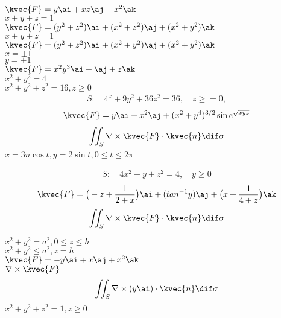 \(\kvec{F}= y \ai + xz \aj + x^2 \ak \) \\
\(x+y+z=1\)\\

\(\kvec{F}= (y^2 +z^2)\ai + (x^2+z^2)\aj + (x^2+y^2)\ak \) \\
\(x+y+z=1\) \\

\(\kvec{F}=(y^2+z^2)\ai + (x^2+y^2)\aj + (x^2+y^2)\ak \) \\
\(x=\pm1 \) \\
\(y=\pm1 \) \\

\(\kvec{F}=x^2y^3\ai + \aj +z\ak \) \\
\(x^2+y^2=4 \) \\
\(x^2 +y^2 +z^2 =16 , z\ge 0 \) \\

\begin{align*}
S: \quad 4^x+9y^2+36z^2 =36, \quad z\ge=0,
\end{align*}
\begin{align*}
\kvec{F}= y\ai +x^2\aj + (x^2 +y^4 )^{3/2} \sin e^{\sqrt{xyz}}
\end{align*}
\begin{align*}
\iint_S \nabla \times \kvec{F} \cdot \kvec{n} \dif \sigma
\end{align*}
\( x=3n\cos t, y=2 \sin t, 0\le t\le 2\pi \) 

\begin{align*}
S: \quad 4x^2 +y+z^2=4, \quad y\ge0
\end{align*}
\begin{align*}
\kvec{F} = \big( -z + \frac{1}{2+x} \big)\ai + (tan^{-1} y) \aj + \big( x + \frac{1}{4+z} \big) \ak
\end{align*}
\begin{align*}
\iint_S \nabla \times \kvec{F} \cdot \kvec{n} \dif \sigma
\end{align*}

\(x^2 + y^2 = a^2 , 0 \le z \le h \) \\
\(x^2+y^2 \le a^2, z=h  \) \\
\(\kvec{F} = - y \ai + x\aj + x^2 \ak \) \\
\( \nabla \times \kvec{F} \) \\

\begin{align*}
\iint_S \nabla \times (y \ai) \cdot \kvec{n} \dif \sigma 
\end{align*} 
\( x^2 + y^2 + z^2 =1, z \ge 0 \) \\

